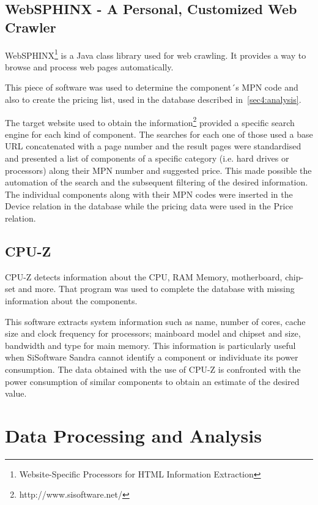     \subsection{WebSPHINX - A Personal, Customized Web Crawler} \label{sec3:websphinx}
        WebSPHINX\footnote{Website-Specific Processors for HTML Information Extraction} is a Java class library used for web crawling. It provides a way to browse and process web pages automatically.
        
        This piece of software was used to determine the component´s MPN code and also to create the pricing list, used in the database described in~\ref{sec4:analysis}.

        The target website used to obtain the information\footnote{http://www.sisoftware.net/} provided a specific search engine for each kind of component. The searches for each one of those used a base URL concatenated with a page number and the result pages were standardised and presented a list of components of a specific category (i.e. hard drives or processors) along their MPN number and suggested price. This made possible the automation of the search and the subsequent filtering of the desired information.
        The individual components along with their MPN codes were inserted in the Device relation in the database while the pricing data were used in the Price relation.

    \subsection{CPU-Z} \label{sec3:cpu-z}
        CPU-Z detects information about the CPU, RAM Memory, motherboard, chip-set and more. That program was used to complete the database with missing information about the components.

        This software extracts system information such as name, number of cores, cache size and clock frequency for processors; mainboard model and chipset and size, bandwidth and type for main memory. This information is particularly useful when SiSoftware Sandra cannot identify a component or individuate its power consumption. The data obtained with the use of CPU-Z is confronted with the power consumption of similar components to obtain an estimate of the desired value.

\section{Data Processing and Analysis} \label{sec3:data_processing_analysis}
    
